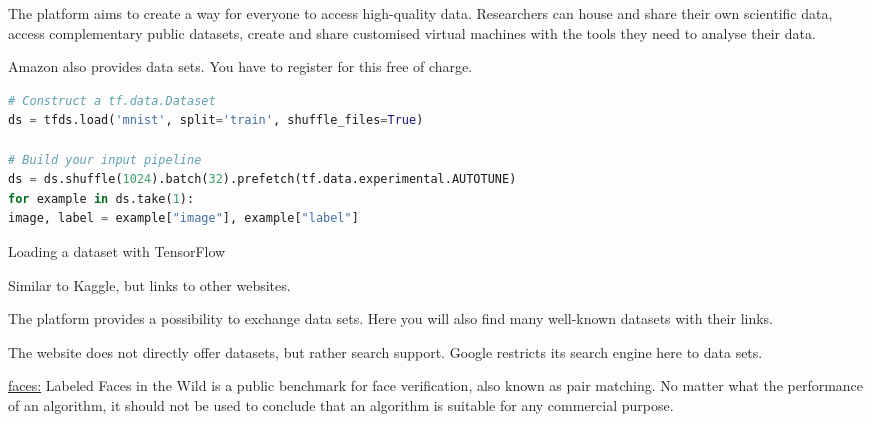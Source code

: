 {\begin{description}
  \item [\href{https://www.opensciencedatacloud.org}{Open Science Data Cloud:}] The platform aims to create a way for everyone to access high-quality data. Researchers can house and share their own scientific data, access complementary public datasets, create and share customised virtual machines with the tools they need to analyse their data.
  
  \item[\href{http://aws.amazon.com/de/datasets/}{Amazon:}] Amazon also provides data sets. You have to register for this free of charge.
  
  \begin{code}
    \begin{lstlisting}[language=python]
# Construct a tf.data.Dataset
ds = tfds.load('mnist', split='train', shuffle_files=True)

# Build your input pipeline
ds = ds.shuffle(1024).batch(32).prefetch(tf.data.experimental.AUTOTUNE)
for example in ds.take(1):
image, label = example["image"], example["label"]
    \end{lstlisting}
    \caption{Loading a dataset with TensorFlow}
  \end{code}


  \item [\href{https://www.kdnuggets.com/datasets}{KDnuggets.com:}] Similar to Kaggle, but links to other websites.
  
  \item [\href{https://paperswithcode.com/datasetss}{paperswithcode.com:}] The platform provides a possibility to exchange data sets. Here you will also find many well-known datasets with their links.
  
  \item [\href{https://datasetsearch.research.google.com}{Google Dataset Search:}] The website does not directly offer datasets, but rather search support. Google restricts its search engine here to data sets.
  
  \item \href{http://vis-www.cs.umass.edu/lfw/}{faces:} Labeled Faces in the Wild is a public benchmark for face verification, also known as pair matching. No matter what the performance of an algorithm, it should not be used to conclude that an algorithm is suitable for any commercial purpose.


\end{description}




}






{
}
